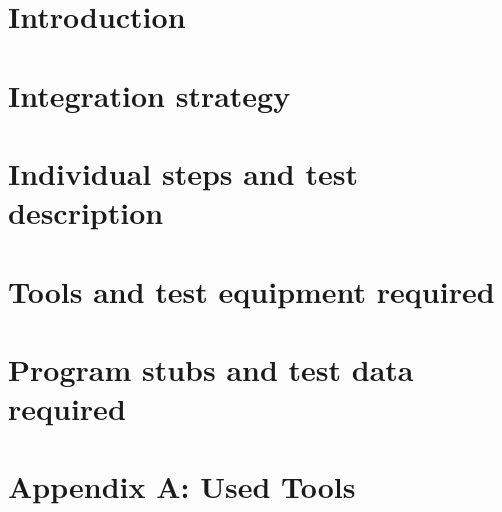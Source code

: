 \documentclass[openright]{report}
\newcommand\blankpage{%
    \null
    \thispagestyle{empty}%
    \addtocounter{page}{-1}%
    \newpage}
\begin{document}
	\begin{titlepage}
		
	\end{titlepage}


    \tableofcontents

    \newpage
    \blankpage
    \begin{abstract}
		
	\end{abstract}


    \chapter{Introduction}
    	

	\chapter{Integration strategy}
		

    \chapter{Individual steps and test description}
    	

    \chapter{Tools and test equipment required}
    	

    \chapter{Program stubs and test data required}
    	



    \clearpage
	\setcounter{page}{1}

	\blankpage

    \appendix
    \newpage
    \chapter{Appendix A: Used Tools}
	    
\end{document}
